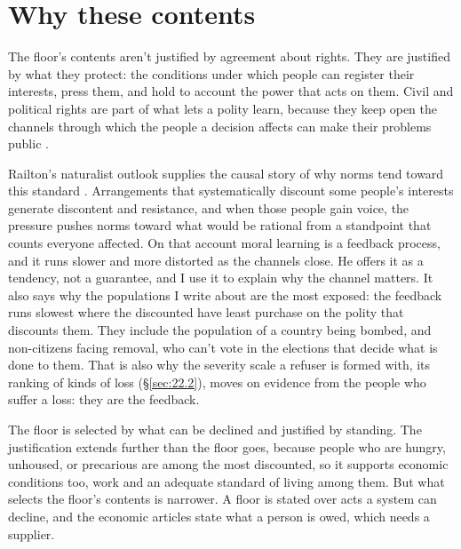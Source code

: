 \section{Why these contents}
\label{sec:5.2}
The floor's contents aren't justified by agreement about rights. They are justified by what they protect: the conditions under which people can register their interests, press them, and hold to account the power that acts on them. Civil and political rights are part of what lets a polity learn, because they keep open the channels through which the people a decision affects can make their problems public \autocite{dewey1927public}.

Railton's naturalist outlook supplies the causal story of why norms tend toward this standard \autocite{railton1986moral}. Arrangements that systematically discount some people's interests generate discontent and resistance, and when those people gain voice, the pressure pushes norms toward what would be rational from a standpoint that counts everyone affected. On that account moral learning is a feedback process, and it runs slower and more distorted as the channels close. He offers it as a tendency, not a guarantee, and I use it to explain why the channel matters. It also says why the populations I write about are the most exposed: the feedback runs slowest where the discounted have least purchase on the polity that discounts them. They include the population of a country being bombed, and non-citizens facing removal, who can't vote in the elections that decide what is done to them. That is also why the severity scale a refuser is formed with, its ranking of kinds of loss (\S\ref{sec:22.2}), moves on evidence from the people who suffer a loss: they are the feedback.

The floor is selected by what can be declined and justified by standing. The justification extends further than the floor goes, because people who are hungry, unhoused, or precarious are among the most discounted, so it supports economic conditions too, work and an adequate standard of living among them. But what selects the floor's contents is narrower. A floor is stated over acts a system can decline, and the economic articles state what a person is owed, which needs a supplier.

